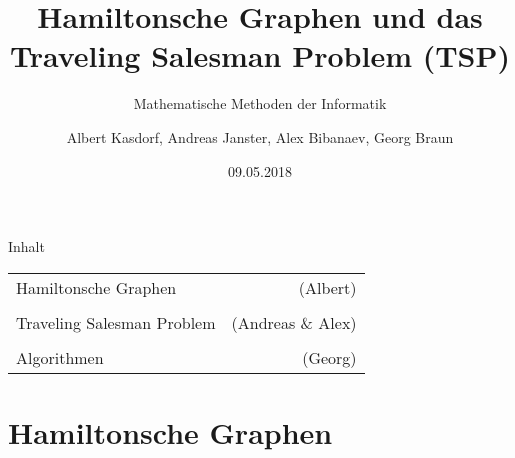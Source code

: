 \documentclass{beamer}
\title[Hamiltonsche Grafen und das TSP]{Hamiltonsche Graphen und das\\ Traveling Salesman Problem (TSP)}
\subtitle{Mathematische Methoden der Informatik}
\author[]
{
	Albert Kasdorf, Andreas Janster, Alex Bibanaev, Georg Braun
}
\institute[FH Aachen]
{
	FH Aachen\\
	Fachbereich Elektrotechnik und Informationstechnik\\
	Ingenieur-Informatik
}
\date{09.05.2018}
\begin{document}
%
%
\frame{\titlepage}


%
%
\begin{frame}{Inhalt}


	\begin{tabular}{ l r }
		Hamiltonsche Graphen & (Albert) \\
		\\
		Traveling Salesman Problem & (Andreas \& Alex) \\
		\\
		Algorithmen & (Georg)
	\end{tabular}

\end{frame}


%
%
%
\part{Hamiltonsche Graphen}
\end{document}

